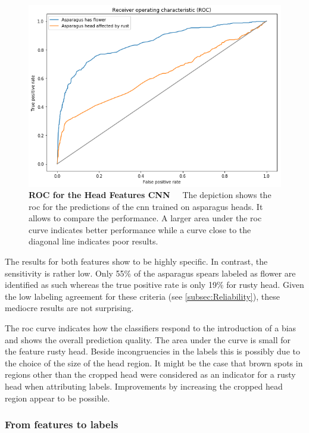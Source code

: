 \begin{figure}[!t]
	\centering
	\vspace{2cm}
	\includegraphics[scale=1.55]{Figures/chapter04/head_roc.png}
	\decoRule
	\caption[Head Features CNN ROC Curve]{\textbf{ROC for the Head Features CNN}~~~The depiction shows the \acrfull{roc} for the predictions of the \acrshort{cnn} trained on asparagus heads. It allows to compare the performance. A larger area under the \acrshort{roc} curve indicates better performance while a curve close to the diagonal line indicates poor results.}
	\label{fig:HeadROC}
\end{figure}

\bigskip
The results for both features show to be highly specific. In contrast, the sensitivity is rather low. Only 55\% of the asparagus spears labeled as flower are identified as such whereas the true positive rate is only 19\% for rusty head. Given the low labeling agreement for these criteria (see \autoref{subsec:Reliability}), these mediocre results are not surprising.

The \acrshort{roc} curve indicates how the classifiers respond to the introduction of a bias and shows the overall prediction quality. The area under the curve is small for the feature rusty head. Beside incongruencies in the labels this is possibly due to the choice of the size of the head region. It might be the case that brown spots in regions other than the cropped head were considered as an indicator for a rusty head when attributing labels. Improvements by increasing the cropped head region appear to be possible.


\subsubsection{From features to labels}
\label{subsec:FeaturesToLabels}

